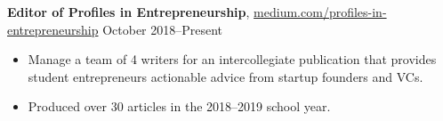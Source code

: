 \documentclass[10pt]{article}
\begin{document}
\textbf{Editor of Profiles in Entrepreneurship}, \href{https://medium.com/profiles-in-entrepreneurship}{medium.com/profiles-in-entrepreneurship} \hfill October 2018--Present
\begin{itemize}
	\item Manage a team of 4 writers for an intercollegiate publication that provides student entrepreneurs actionable advice from startup founders and VCs.
	\item Produced over 30 articles in the 2018--2019 school year.
\end{itemize}
\end{document}
